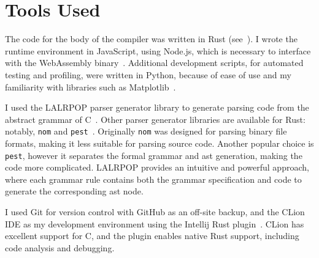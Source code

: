\documentclass[00-main.tex]{subfiles}
\begin{document}
\section{Tools Used}

The code for the body of the compiler was written in Rust (see~).
I wrote the runtime environment in JavaScript, using Node.js, which is necessary to interface with the Web\-Assembly binary~.
Additional development scripts, for automated testing and profiling, were written in Python, because of ease of use and my familiarity with libraries such as Matplotlib~.

I used the LALRPOP parser generator library to generate parsing code from the abstract grammar of C~.
Other parser generator libraries are available for Rust: notably, \texttt{nom} and \texttt{pest}~.
Originally \texttt{nom} was designed for parsing binary file formats, making it less suitable for parsing source code.
Another popular choice is \texttt{pest}, however it separates the formal grammar and \gls{ast} generation, making the code more complicated.
LALRPOP provides an intuitive and powerful approach, where each grammar rule contains both the grammar specification and code to generate the corresponding \gls{ast} node.

I used Git for version control with GitHub as an off-site backup, and the CLion IDE as my development environment using the Intellij Rust plugin~.
CLion has excellent support for C, and the plugin enables native Rust support, including code analysis and debugging.
\end{document}
